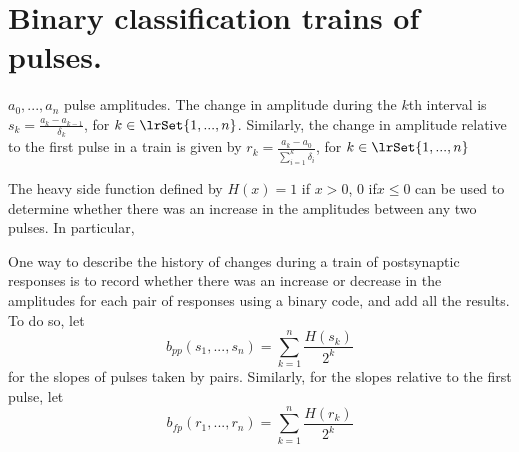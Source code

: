 
\section{Binary classification trains of pulses.}

$a_{0},...,a_{n}$ pulse amplitudes. The change in amplitude during the $k$th interval is $s_{k}= \frac{a_{k} - a_{k-1}}{\delta_{k}}$, for $k \in \lrSet{1,...,n}$. Similarly, the change in amplitude relative to the first pulse in a train is given by $r_{k}=\frac{a_{k} - a_{0}}{\sum_{i=1}^{k}\delta_{i}}$, for $k \in \lrSet{1,...,n}$

The heavy side function defined by  $H(x)=1$ if $x>0$, 0 if$x\leq 0$ can be used to determine whether there was an increase in the amplitudes between any two pulses. In particular, 

One way to describe the history of changes during a train of postsynaptic responses is to record whether there was an increase or decrease in the amplitudes for each pair of responses using a binary code, and add all the results. To do so, let
\begin{equation}
b_{pp}(s_{1},...,s_{n}) = \sum_{k=1}^{n} \frac{H(s_{k})}{2^{k}}
\end{equation}
for the slopes of pulses taken by pairs. Similarly, for the slopes relative to the first pulse, let
\begin{equation}
b_{fp}(r_{1},...,r_{n}) = \sum_{k=1}^{n} \frac{H(r_{k})}{2^{k}}
\end{equation}









